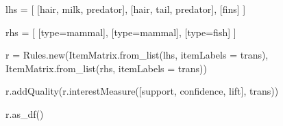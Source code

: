 \documentclass{article}
\newenvironment{Shaded}{}{}
\newcommand{\NormalTok}[1]{#1}
\newcommand{\OperatorTok}[1]{\textcolor[rgb]{0.40,0.40,0.40}{#1}}
\newcommand{\StringTok}[1]{\textcolor[rgb]{0.25,0.44,0.63}{#1}}
\begin{document}
\begin{Shaded}
\begin{Highlighting}[]
\NormalTok{lhs }\OperatorTok{=}\NormalTok{ [}
\NormalTok{    [}\StringTok{\textquotesingle{}hair\textquotesingle{}}\NormalTok{, }\StringTok{\textquotesingle{}milk\textquotesingle{}}\NormalTok{, }\StringTok{\textquotesingle{}predator\textquotesingle{}}\NormalTok{],}
\NormalTok{    [}\StringTok{\textquotesingle{}hair\textquotesingle{}}\NormalTok{, }\StringTok{\textquotesingle{}tail\textquotesingle{}}\NormalTok{, }\StringTok{\textquotesingle{}predator\textquotesingle{}}\NormalTok{],}
\NormalTok{    [}\StringTok{\textquotesingle{}fins\textquotesingle{}}\NormalTok{]}
\NormalTok{]}

\NormalTok{rhs }\OperatorTok{=}\NormalTok{ [}
\NormalTok{    [}\StringTok{\textquotesingle{}type=mammal\textquotesingle{}}\NormalTok{],}
\NormalTok{    [}\StringTok{\textquotesingle{}type=mammal\textquotesingle{}}\NormalTok{],}
\NormalTok{    [}\StringTok{\textquotesingle{}type=fish\textquotesingle{}}\NormalTok{]}
\NormalTok{]}
                          
\NormalTok{r }\OperatorTok{=}\NormalTok{ Rules.new(ItemMatrix.from\_list(lhs, itemLabels }\OperatorTok{=}\NormalTok{ trans),}
\NormalTok{              ItemMatrix.from\_list(rhs, itemLabels }\OperatorTok{=}\NormalTok{ trans))}

\NormalTok{r.addQuality(r.interestMeasure([}\StringTok{\textquotesingle{}support\textquotesingle{}}\NormalTok{, }\StringTok{\textquotesingle{}confidence\textquotesingle{}}\NormalTok{, }\StringTok{\textquotesingle{}lift\textquotesingle{}}\NormalTok{], trans))}

\NormalTok{r.as\_df()}
\end{Highlighting}
\end{Shaded}
\end{document}

